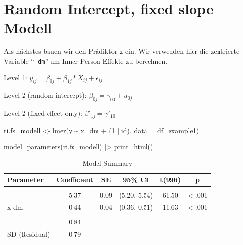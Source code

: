 \documentclass[
  letterpaper,
  DIV=11,
  numbers=noendperiod]{scrreprt}
\newenvironment{Shaded}{\begin{snugshade}}{\end{snugshade}}
\newcommand{\AttributeTok}[1]{\textcolor[rgb]{0.40,0.45,0.13}{#1}}
\newcommand{\DecValTok}[1]{\textcolor[rgb]{0.68,0.00,0.00}{#1}}
\newcommand{\FunctionTok}[1]{\textcolor[rgb]{0.28,0.35,0.67}{#1}}
\newcommand{\NormalTok}[1]{\textcolor[rgb]{0.00,0.23,0.31}{#1}}
\newcommand{\OtherTok}[1]{\textcolor[rgb]{0.00,0.23,0.31}{#1}}
\newcommand{\SpecialCharTok}[1]{\textcolor[rgb]{0.37,0.37,0.37}{#1}}
\begin{document}
\section{Random Intercept, fixed slope
Modell}\label{random-intercept-fixed-slope-modell}

Als nächstes bauen wir den Prädiktor x ein. Wir verwenden hier die
zentrierte Variable ``\texttt{\_dm}'' um Inner-Person Effekte zu
berechnen.

Level 1: \(y_{ij} = \beta_{0j} + \beta_{1j}*X_{ij} + e_{ij}\)

Level 2 (random intercept): \(\beta_{0j} = \gamma_{00} + u_{0j}\)

Level 2 (fixed effect only): \(\beta'_{1j} = \gamma'_{10}\)

\begin{Shaded}
\begin{Highlighting}[]
\NormalTok{ri.fs\_modell }\OtherTok{\textless{}{-}} \FunctionTok{lmer}\NormalTok{(y }\SpecialCharTok{\textasciitilde{}}\NormalTok{ x\_dm }\SpecialCharTok{+}\NormalTok{ (}\DecValTok{1} \SpecialCharTok{|}\NormalTok{ id), }\AttributeTok{data =}\NormalTok{ df\_example1)}
\end{Highlighting}
\end{Shaded}

\begin{Shaded}
\begin{Highlighting}[]
\FunctionTok{model\_parameters}\NormalTok{(ri.fs\_modell) }\SpecialCharTok{|\textgreater{}} \FunctionTok{print\_html}\NormalTok{()}
\end{Highlighting}
\end{Shaded}

\begin{table}
\caption*{
{\large Model Summary}
} 
\fontsize{12.0pt}{14.4pt}\selectfont
\begin{tabular*}{\linewidth}{@{\extracolsep{\fill}}lccccc}
\toprule
Parameter & Coefficient & SE & 95\% CI & t(996) & p \\ 
\midrule\addlinespace[2.5pt]
\multicolumn{6}{l}{{\slshape Fixed Effects }} \\[2.5pt] 
\midrule\addlinespace[2.5pt]
{(Intercept)} & 5.37 & 0.09 & (5.20, 5.54) & 61.50 & < .001 \\ 
{x dm} & 0.44 & 0.04 & (0.36, 0.51) & 11.63 & < .001 \\ 
\midrule\addlinespace[2.5pt]
\multicolumn{6}{l}{{\slshape Random Effects }} \\[2.5pt] 
\midrule\addlinespace[2.5pt]
{SD (Intercept: id)} & 0.84 &  &  &  &  \\ 
{SD (Residual)} & 0.79 &  &  &  &  \\ 
\bottomrule
\end{tabular*}
\begin{minipage}{\linewidth}
\\
\end{minipage}
\end{table}
\end{document}
